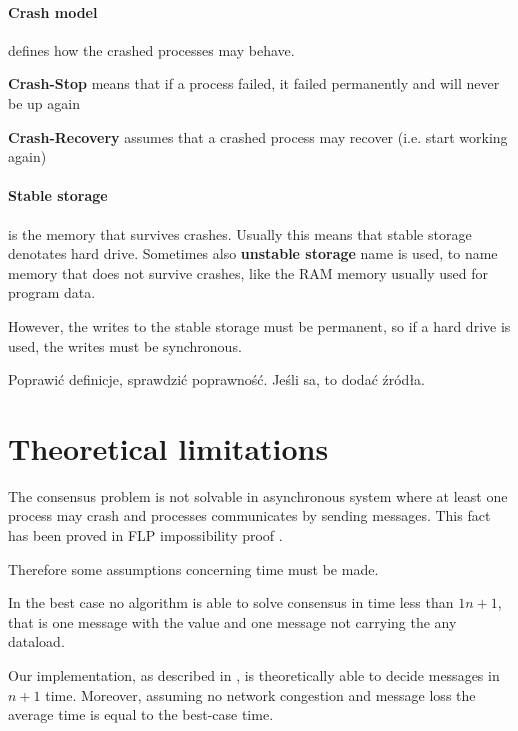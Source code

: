 \paragraph{Crash model}
defines how the crashed processes may behave.
\begin{list}{}{ \setlength{\leftmargin}{0.2\textwidth} \setlength{\itemindent}{-0.1\textwidth}}
 \item[\textbf{Crash-Stop}] means that if a process failed, it failed permanently and will never be up again
 \item[\textbf{Crash-Recovery}] assumes that a crashed process may recover (i.e. start working again)
\end{list}

\paragraph{Stable storage}
is the memory that survives crashes. Usually this means that stable storage denotates hard drive.
Sometimes also \textbf{unstable storage} name is used, to name memory that does not survive crashes, like the RAM memory usually used for program data.

However, the writes to the stable storage must be permanent, so if a hard drive is used, the writes must be synchronous.

\begin{TODO}
 Poprawić definicje, sprawdzić poprawność. Jeśli sa, to dodać źródła.
\end{TODO}

\section{Theoretical limitations}


The consensus problem is not solvable in asynchronous system where at least one process may crash and processes communicates by sending messages. This fact has been proved in FLP impossibility proof \cite{FLP}.

Therefore some assumptions concerning time must be made.


In the best case no algorithm is able to solve consensus in time less than $1n+1$, that is one message with the value and one message not carrying the any dataload.

Our implementation, as described in %
, is theoretically able to decide messages in $n+1$ time. Moreover, assuming no network congestion and message loss the average time is equal to the best-case time.

